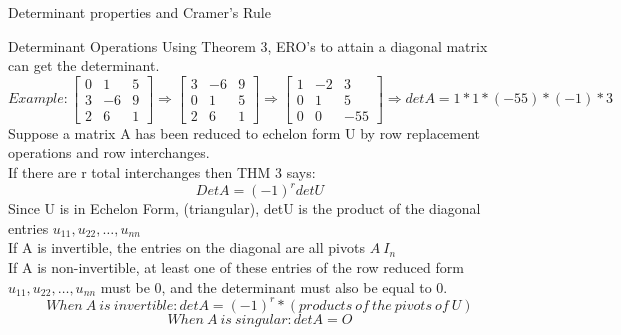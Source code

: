 \documentclass[a4paper, 12pt]{article}
\begin{document}
\begin{section}{Determinant properties and Cramer's Rule}
\begin{subsection}{Determinant Operations}
Using Theorem 3, ERO's to attain a diagonal matrix can get the determinant.
\begin{equation}{Example:}
\begin{bmatrix} 0&1&5 \\ 3&-6&9\\ 2&6&1 \end{bmatrix} \Rightarrow
\begin{bmatrix} 3&-6&9\\ 0&1&5 \\ 2&6&1 \end{bmatrix} \Rightarrow
\begin{bmatrix} 1&-2&3\\ 0&1&5\\ 0&0&-55 \end{bmatrix}\Rightarrow 
detA=1*1*(-55)*(-1)*3
\end{equation}
Suppose a matrix A has been reduced to echelon form U by row replacement 
operations and row interchanges.\\
If there are r total interchanges then THM 3 says:
\begin{equation} DetA=(-1)^{r}detU \end{equation}
Since U is in Echelon Form, (triangular), detU is the product of the
diagonal entries $u_{11},u_{22},\dots,u_{nn}$\\
If A is invertible, the entries on the diagonal are all pivots
$A~I_{n}$\\
If A is non-invertible, at least one of these entries of the row reduced
form $u_{11},u_{22},\dots,u_{nn}$ must be 0, and the determinant must
also be equal to 0.
\begin{equation}{When~A~is~invertible:}
detA=(-1)^{r}*(products~of~the~pivots~of~U) \end{equation}
\begin{equation}{When~A~is~singular:}detA=O\end{equation}
\end{subsection}


\end{section}
\end{document}

